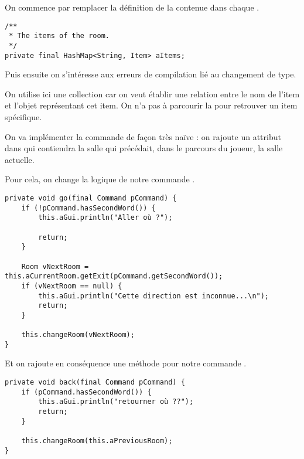 \begin{exercise}[subtitle=Items]

On commence par remplacer la définition de la  contenue dans chaque .

\begin{verbatim}
/**
 * The items of the room.
 */
private final HashMap<String, Item> aItems;
\end{verbatim}

Puis ensuite on s'intéresse aux erreurs de compilation lié au changement de type.

On utilise ici une collection  car on veut établir une relation entre le nom de l'item et l'objet représentant cet item. On n'a pas à parcourir la  pour retrouver un item spécifique.
\end{exercise}

\begin{exercise}[subtitle=Commande back]

On va implémenter la commande  de façon très naïve : on rajoute un attribut  dans  qui contiendra la salle qui précédait, dans le parcours du joueur, la salle actuelle.

Pour cela, on change la logique de notre commande .

\begin{verbatim}
private void go(final Command pCommand) {
    if (!pCommand.hasSecondWord()) {
        this.aGui.println("Aller où ?");

        return;
    }

    Room vNextRoom = this.aCurrentRoom.getExit(pCommand.getSecondWord());
    if (vNextRoom == null) {
        this.aGui.println("Cette direction est inconnue...\n");
        return;
    }

    this.changeRoom(vNextRoom);
}
\end{verbatim}

Et on rajoute en conséquence une méthode pour notre commande .

\begin{verbatim}
private void back(final Command pCommand) {
    if (pCommand.hasSecondWord()) {
        this.aGui.println("retourner où ??");
        return;
    }

    this.changeRoom(this.aPreviousRoom);
}
\end{verbatim}
\end{exercise}


